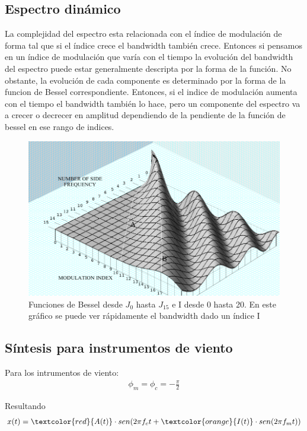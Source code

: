 \documentclass[assd_tp2_main.tex]{subfiles}
\begin{document}
\newpage

\subsection{Espectro dinámico}
La complejidad del espectro esta relacionada con el índice de modulación de forma tal que si el índice crece el bandwidth también crece. Entonces si pensamos en un índice de modulación que varía con el tiempo la evolución del bandwidth del espectro puede estar generalmente descripta por la forma de la función.
No obstante, la evolución de cada componente es determinado por la forma de la funcion de Bessel correspondiente.
Entonces, si el indice de modulación aumenta con el tiempo el bandwidth también lo hace, pero un componente del espectro va a crecer o decrecer en amplitud dependiendo de la pendiente de la función de bessel en ese rango de indices.

\begin{figure}[H]
\centering
\includegraphics[width=0.8\linewidth]{graficos/EJ4/EspectroDinamico.png}
\caption{Funciones de Bessel desde $J_0$ hasta $J_{15}$ e I desde 0 hasta 20. En este gráfico se puede ver rápidamente el bandwidth dado un índice I}
\label{fig:DynamicSpectrum}
\end{figure}



\subsection{Síntesis para instrumentos de viento}
Para los intrumentos de viento:
\begin{eqnarray*}
\displaystyle \phi_m=\phi_c=-\frac{\pi}{2}
\end{eqnarray*}
\par
Resultando
\begin{eqnarray*}
\textstyle x(t)=\textcolor{red}{A(t)}\cdot sen(2\pi f_c t+\textcolor{orange}{I(t)}\cdot sen(2\pi f_mt))
\end{eqnarray*}
\end{document}
